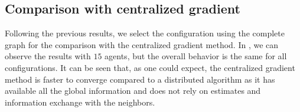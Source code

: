 \documentclass[a4paper,11pt,oneside]{book}
\begin{document}


\subsection{Comparison with centralized gradient}

Following the previous results, we select the configuration using the complete graph for the comparison with the centralized gradient method. In , we can observe the results with $15$ agents, but the overall behavior is the same for all configurations. It can be seen that, as one could expect, the centralized gradient method is faster to converge compared to a distributed algorithm as it has available all the global information and does not rely on estimates and information exchange with the neighbors.
\end{document}
